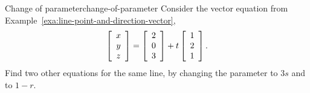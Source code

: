 \documentclass{ximera}
\begin{document}
\begin{example}{Change of parameter}{change-of-parameter}
  Consider the vector equation from
  Example~\ref{exa:line-point-and-direction-vector},
  \begin{equation*}
    \startmat{c} x \\ y \\ z \stopmat
    = \startmat{c} 2 \\ 0 \\ 3 \stopmat
    + t \startmat{c} 1 \\ 2 \\ 1 \stopmat.
  \end{equation*}
  Find two other equations for the same line, by changing the
  parameter%
   to $3s$ and to $1-r$.
\end{example}
\end{document}
